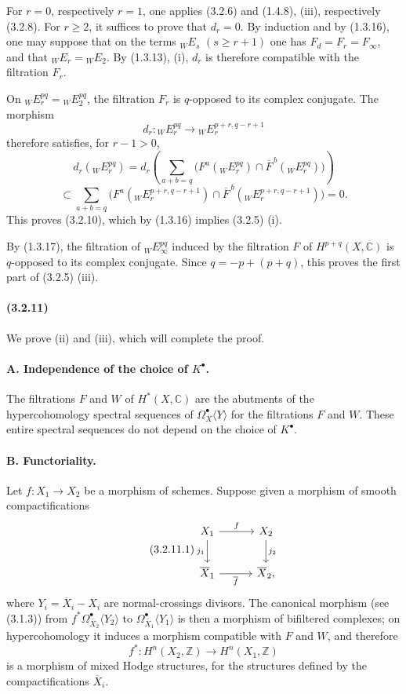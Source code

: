 \documentclass[10pt]{article}
\newcommand{\C}{\mathbb C}
\newcommand{\Z}{\mathbb Z}
\begin{document}
For $r=0$, respectively $r=1$, one applies (3.2.6) and (1.4.8), (iii), respectively (3.2.8). For $r\ge2$, it suffices to prove that $d_r=0$. By induction and by (1.3.16), one may suppose that on the terms ${}_WE_s$ $(s\ge r+1)$ one has $F_d=F_r=F_\infty$, and that ${}_WE_r={}_WE_2$. By (1.3.13), (i), $d_r$ is therefore compatible with the filtration $F_r$.

On ${}_WE_r^{pq}={}_WE_2^{pq}$, the filtration $F_r$ is $q$-opposed to its complex conjugate. The morphism
\[
d_r:{}_W E_r^{pq}\longrightarrow {}_W E_r^{p+r,q-r+1}
\]
therefore satisfies, for $r-1>0$,
\[
d_r({}_W E_r^{pq})
=d_r\!\left(\sum_{a+b=q}\bigl(F^a({}_W E_r^{pq})\cap
\overline F^{\,b}({}_W E_r^{pq})\bigr)\right)
\]
\[
\subset
\sum_{a+b=q}\bigl(F^a({}_WE_r^{p+r,q-r+1})\cap
\overline F^{\,b}({}_WE_r^{p+r,q-r+1})\bigr)=0.
\]
This proves (3.2.10), which by (1.3.16) implies (3.2.5) (i).

By (1.3.17), the filtration of ${}_WE_\infty^{pq}$ induced by the filtration $F$ of $H^{p+q}(X,\C)$ is $q$-opposed to its complex conjugate. Since $q=-p+(p+q)$, this proves the first part of (3.2.5) (iii).

\paragraph{(3.2.11)} We prove (ii) and (iii), which will complete the proof.

\paragraph{A. Independence of the choice of $K^\bullet$.} The filtrations $F$ and $W$ of $H^*(X,\C)$ are the abutments of the hypercohomology spectral sequences of $\Omega_{\overline X}^{\bullet}\langle Y\rangle$ for the filtrations $F$ and $W$. These entire spectral sequences do not depend on the choice of $K^\bullet$.

\paragraph{B. Functoriality.} Let $f:X_1\to X_2$ be a morphism of schemes. Suppose given a morphism of smooth compactifications
\[
\tag{3.2.11.1}
\begin{tikzcd}[column sep=3em,row sep=2.1em]
X_1 \arrow[r,"f"] \arrow[d,"j_1"'] & X_2 \arrow[d,"j_2"]\\
\overline X_1 \arrow[r,"\overline f"'] & \overline X_2 ,
\end{tikzcd}
\]
where $Y_i=\overline X_i-X_i$ are normal-crossings divisors. The canonical morphism (see (3.1.3)) from $f^*\Omega_{\overline X_2}^{\bullet}\langle Y_2\rangle$ to $\Omega_{\overline X_1}^{\bullet}\langle Y_1\rangle$ is then a morphism of bifiltered complexes; on hypercohomology it induces a morphism compatible with $F$ and $W$, and therefore
\[
f^*:H^n(X_2,\Z)\longrightarrow H^n(X_1,\Z)
\]
is a morphism of mixed Hodge structures, for the structures defined by the compactifications $\overline X_i$.
\end{document}
